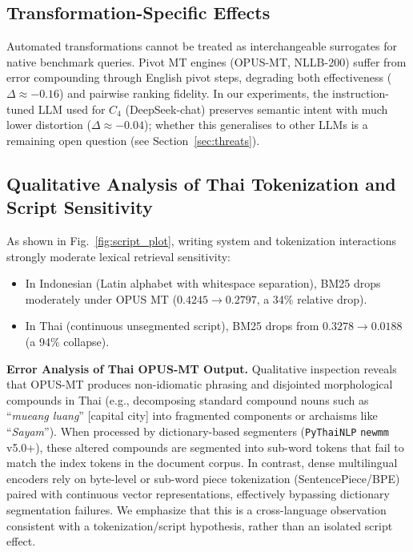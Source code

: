 \documentclass[runningheads]{llncs}
\begin{document}
\subsection{Transformation-Specific Effects}
Automated transformations cannot be treated as interchangeable surrogates for native benchmark queries. Pivot MT engines (OPUS-MT, NLLB-200) suffer from error compounding through English pivot steps, degrading both effectiveness ($\Delta \approx -0.16$) and pairwise ranking fidelity. In our experiments, the instruction-tuned LLM used for $C_4$ (DeepSeek-chat) preserves semantic intent with much lower distortion ($\Delta \approx -0.04$); whether this generalises to other LLMs is a remaining open question (see Section~\ref{sec:threats}).

\subsection{Qualitative Analysis of Thai Tokenization and Script Sensitivity}
As shown in Fig.~\ref{fig:script_plot}, writing system and tokenization interactions strongly moderate lexical retrieval sensitivity:
\begin{itemize}
    \item In Indonesian (Latin alphabet with whitespace separation), BM25 drops moderately under OPUS MT ($0.4245 \rightarrow 0.2797$, a 34\% relative drop).
    \item In Thai (continuous unsegmented script), BM25 drops from $0.3278 \rightarrow 0.0188$ (a 94\% collapse).
\end{itemize}
\noindent\textbf{Error Analysis of Thai OPUS-MT Output.} Qualitative inspection reveals that OPUS-MT produces non-idiomatic phrasing and disjointed morphological compounds in Thai (e.g., decomposing standard compound nouns such as ``\textit{mueang luang}'' [capital city] into fragmented components or archaisms like ``\textit{Sayam}''). When processed by dictionary-based segmenters (\texttt{PyThaiNLP} \texttt{newmm} v5.0+), these altered compounds are segmented into sub-word tokens that fail to match the index tokens in the document corpus. In contrast, dense multilingual encoders rely on byte-level or sub-word piece tokenization (SentencePiece/BPE) paired with continuous vector representations, effectively bypassing dictionary segmentation failures. We emphasize that this is a cross-language observation consistent with a tokenization/script hypothesis, rather than an isolated script effect.
\end{document}
